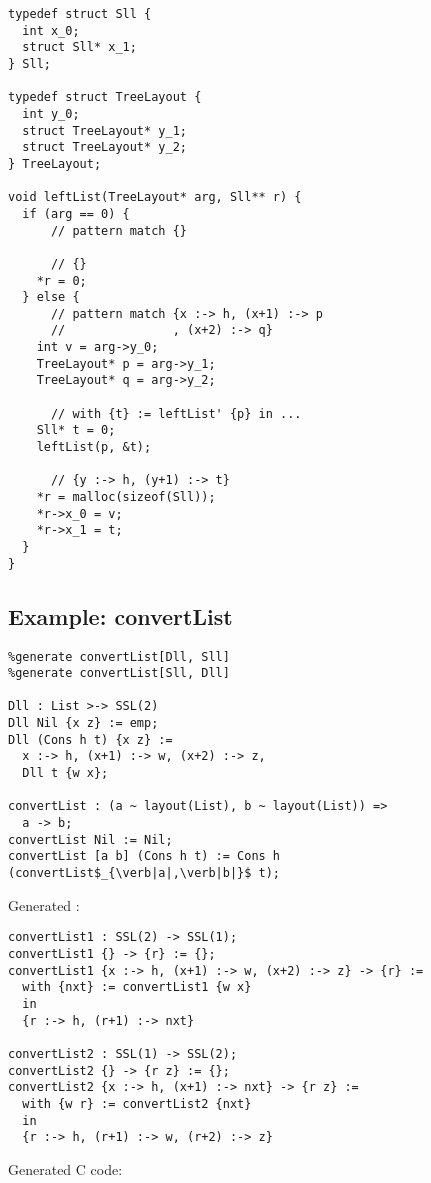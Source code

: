 \begin{lstlisting}
typedef struct Sll {
  int x_0;
  struct Sll* x_1;
} Sll;

typedef struct TreeLayout {
  int y_0;
  struct TreeLayout* y_1;
  struct TreeLayout* y_2;
} TreeLayout;

void leftList(TreeLayout* arg, Sll** r) {
  if (arg == 0) {
      // pattern match {}

      // {}
    *r = 0;
  } else {
      // pattern match {x :-> h, (x+1) :-> p
      //               , (x+2) :-> q}
    int v = arg->y_0;
    TreeLayout* p = arg->y_1;
    TreeLayout* q = arg->y_2;

      // with {t} := leftList' {p} in ...
    Sll* t = 0;
    leftList(p, &t);

      // {y :-> h, (y+1) :-> t}
    *r = malloc(sizeof(Sll));
    *r->x_0 = v;
    *r->x_1 = t;
  }
}
\end{lstlisting}


\subsection{Example: convertList}

\begin{lstlisting}
%generate convertList[Dll, Sll]
%generate convertList[Sll, Dll]

Dll : List >-> SSL(2)
Dll Nil {x z} := emp;
Dll (Cons h t) {x z} :=
  x :-> h, (x+1) :-> w, (x+2) :-> z,
  Dll t {w x};

convertList : (a ~ layout(List), b ~ layout(List)) =>
  a -> b;
convertList Nil := Nil;
convertList [a b] (Cons h t) := Cons h (convertList$_{\verb|a|,\verb|b|}$ t);
\end{lstlisting}

Generated \PikaCore:

\begin{lstlisting}
convertList1 : SSL(2) -> SSL(1);
convertList1 {} -> {r} := {};
convertList1 {x :-> h, (x+1) :-> w, (x+2) :-> z} -> {r} :=
  with {nxt} := convertList1 {w x}
  in
  {r :-> h, (r+1) :-> nxt}

convertList2 : SSL(1) -> SSL(2);
convertList2 {} -> {r z} := {};
convertList2 {x :-> h, (x+1) :-> nxt} -> {r z} :=
  with {w r} := convertList2 {nxt}
  in
  {r :-> h, (r+1) :-> w, (r+2) :-> z}
\end{lstlisting}

Generated C code:

